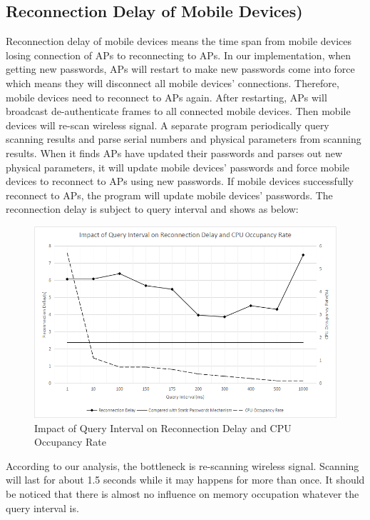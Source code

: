 \subsection{Reconnection Delay of Mobile Devices)}
Reconnection delay of mobile devices means the time span from mobile devices losing connection of APs to reconnecting to APs. In our implementation, when getting new passwords, APs will restart to make new passwords come into force which means they will disconnect all mobile devices’ connections. Therefore, mobile devices need to reconnect to APs again. After restarting, APs will broadcast de-authenticate frames to all connected mobile devices. Then mobile devices will re-scan wireless signal. A separate program periodically query scanning results and parse serial numbers and physical parameters from scanning results. When it finds APs have updated their passwords and parses out new physical parameters, it will update mobile devices’ passwords and force mobile devices to reconnect to APs using new passwords. If mobile devices successfully reconnect to APs, the program will update mobile devices’ passwords. The reconnection delay is subject to query interval and shows as below: \begin{figure}
	\begin{center}
		\includegraphics[width=\textwidth]{Results1.png}
		\caption{Impact of Query Interval on Reconnection Delay and CPU Occupancy Rate }
		\label{Fig:5.1}
	\end{center}
\end{figure}
According to our analysis, the bottleneck is re-scanning wireless signal. Scanning will last for about 1.5 seconds while it may happens for more than once. It should be noticed that there is almost no influence on memory occupation whatever the query interval is. 

